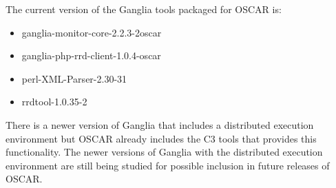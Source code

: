 The current version of the Ganglia tools packaged for OSCAR is:

\begin{itemize}
\item ganglia-monitor-core-2.2.3-2oscar
\item ganglia-php-rrd-client-1.0.4-oscar
\item perl-XML-Parser-2.30-31
\item rrdtool-1.0.35-2
\end{itemize}

There is a newer version of Ganglia that includes a distributed
execution environment but OSCAR already includes the C3 tools that
provides this functionality.  The newer versions of Ganglia with the
distributed execution environment are still being studied for possible
inclusion in future releases of OSCAR.
